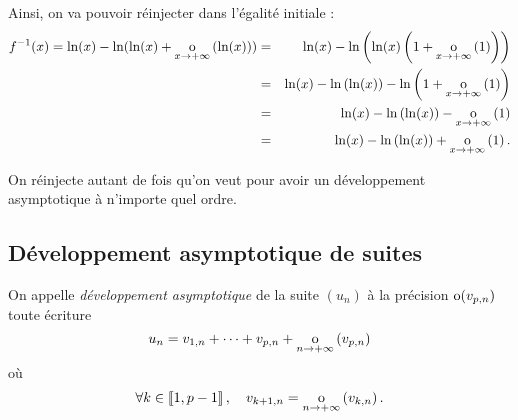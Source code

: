 \documentclass{magnoliaold}
\begin{document}
\begin{exos}
\begin{sol}
Ainsi, on va pouvoir réinjecter dans l'égalité initiale :
\begin{eqnarray*}
f^{-1}(x)=\ln(x)-\ln(\ln(x)+\underset{x \rightarrow +\infty}{\text{o}}\left(\ln(x)\right))&=&\ln(x)-\ln\left(\ln(x)\left(1+\underset{x \rightarrow +\infty}{\text{o}}\left(1\right)\right)\right)\\
&=&\ln(x)-\ln\left(\ln(x)\right)-\ln\left(1+\underset{x \rightarrow +\infty}{\text{o}}\left(1\right)\right)\\
&=&\ln(x)-\ln\left(\ln(x)\right)-\underset{x \rightarrow +\infty}{\text{o}}\left(1\right)\\
&=&\ln(x)-\ln\left(\ln(x)\right)+\underset{x \rightarrow +\infty}{\text{o}}\left(1\right).
\end{eqnarray*}
  
  On réinjecte autant de fois qu'on veut pour avoir un développement asymptotique à n'importe quel ordre.
  \end{sol}
\end{exos}

\subsection{Développement asymptotique de suites}

\begin{definition}[utile=-3]
On appelle \emph{développement asymptotique} de la suite $(u_n)$ à la précision ${\rm o}(v_{p,n})$ toute écriture
\[u_n=v_{1,n}+\cdots+v_{p,n} +\underset{n \rightarrow +\infty}{\text{o}}\left(v_{p,n}\right)\]
où
\[\forall k\in\left\llbracket 1,p-1\right\rrbracket ,\quad v_{k+1,n}=\underset{n \rightarrow +\infty}{\text{o}}\left(v_{k,n}\right).\]
\end{definition}
\end{document}
